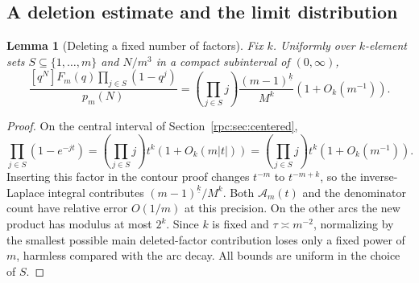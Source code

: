 \documentclass[11pt]{article}
\newtheorem{lemma}[theorem]{Lemma}
\theoremstyle{definition}
\theoremstyle{remark}
\newcommand{\fall}[2]{#1^{\underline{#2}}}
\numberwithin{equation}{section}
\begin{document}
\subsection{A deletion estimate and the limit distribution}

\begin{lemma}[Deleting a fixed number of factors]\label{rpc:lem:delete}
Fix $k$. Uniformly over $k$-element sets $S\subseteq\{1,\ldots,m\}$ and
$N/m^3$ in a compact subinterval of $(0,\infty)$,
\begin{equation}\label{rpc:eq:delete}
 \frac{[q^N]F_m(q)\prod_{j\in S}(1-q^j)}{p_m(N)}
 =\left(\prod_{j\in S}j\right)
       \frac{\fall{(m-1)}k}{M^k}\left(1+O_k(m^{-1})\right).
\end{equation}
\end{lemma}
\begin{proof}
On the central interval of Section~\ref{rpc:sec:centered},
\[
 \prod_{j\in S}(1-e^{-jt})
 =\left(\prod_{j\in S}j\right)t^k(1+O_k(m|t|))
 =\left(\prod_{j\in S}j\right)t^k(1+O_k(m^{-1})).
\]
Inserting this factor in the contour proof changes $t^{-m}$ to $t^{-m+k}$,
so the inverse-Laplace integral contributes $\fall{(m-1)}k/M^k$.
Both $\mathcal A_m(t)$ and the denominator count have relative error
$O(1/m)$ at this precision. On the other arcs the new product has modulus
at most $2^k$. Since $k$ is fixed and $\tau\asymp m^{-2}$, normalizing by
the smallest possible main deleted-factor contribution loses only a fixed
power of $m$, harmless compared with the arc decay. All bounds are uniform
in the choice of $S$.
\end{proof}
\end{document}
